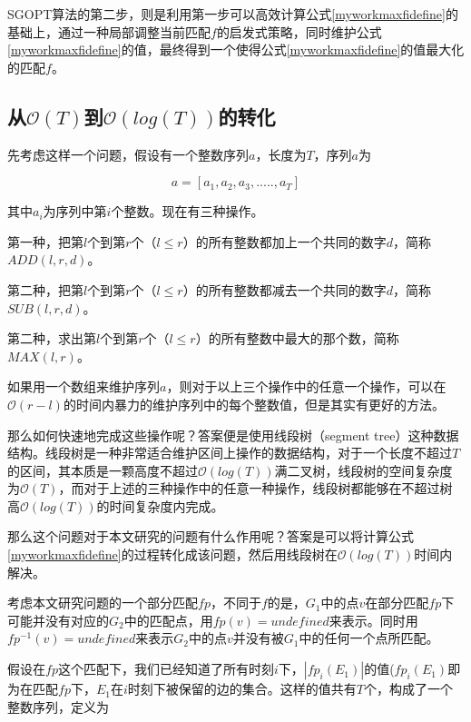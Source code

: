 SGOPT算法的第二步，则是利用第一步可以高效计算公式\ref{myworkmaxfidefine}的基础上，通过一种局部调整当前匹配$f$的启发式策略，同时维护公式\ref{myworkmaxfidefine}的值，最终得到一个使得公式\ref{myworkmaxfidefine}的值最大化的匹配$f$。


\subsection{从$\mathcal{O}(T)$到$\mathcal{O}(log(T))$的转化}
先考虑这样一个问题，假设有一个整数序列$a$，长度为$T$，序列$a$为

\begin{equation}\label{myworkseqdefine}    
a=[a_1,a_2,a_3,.....,a_T]
\end{equation}

其中$a_i$为序列中第$i$个整数。现在有三种操作。

第一种，把第$l$个到第$r$个（$l\leq r$）的所有整数都加上一个共同的数字$d$，简称$ADD(l,r,d)$。

第二种，把第$l$个到第$r$个（$l\leq r$）的所有整数都减去一个共同的数字$d$，简称$SUB(l,r,d)$。

第二种，求出第$l$个到第$r$个（$l\leq r$）的所有整数中最大的那个数，简称$MAX(l,r)$。

如果用一个数组来维护序列$a$，则对于以上三个操作中的任意一个操作，可以在$\mathcal{O}(r-l)$的时间内暴力的维护序列中的每个整数值，但是其实有更好的方法。

那么如何快速地完成这些操作呢？答案便是使用线段树（segment tree）这种数据结构\cite{de2000computational}。线段树是一种非常适合维护区间上操作的数据结构，对于一个长度不超过$T$的区间，其本质是一颗高度不超过$\mathcal{O}(log(T))$满二叉树，线段树的空间复杂度为$\mathcal{O}(T)$，而对于上述的三种操作中的任意一种操作，线段树都能够在不超过树高$\mathcal{O}(log(T))$的时间复杂度内完成。

那么这个问题对于本文研究的问题有什么作用呢？答案是可以将计算公式\ref{myworkmaxfidefine}的过程转化成该问题，然后用线段树在$\mathcal{O}(log(T))$时间内解决。

考虑本文研究问题的一个部分匹配$fp$，不同于$f$的是，$G_1$中的点$v$在部分匹配$fp$下可能并没有对应的$G_2$中的匹配点，用$fp(v)=undefined$来表示。同时用$fp^{-1}(v)=undefined$来表示$G_2$中的点$v$并没有被$G_1$中的任何一个点所匹配。

假设在$fp$这个匹配下，我们已经知道了所有时刻$i$下，$|fp_i(E_1)|$的值($fp_i(E_1)$即为在匹配$fp$下，$E_1$在$i$时刻下被保留的边的集合。这样的值共有$T$个，构成了一个整数序列，定义为

